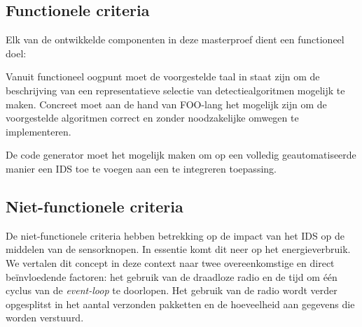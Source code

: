 \vspace{-3mm}

\subsection{Functionele criteria}

Elk van de ontwikkelde componenten in deze masterproef dient een functioneel
doel:

\begin{description}[noitemsep, topsep=0pt, partopsep=1pt]

  \item[Expressiviteit] Vanuit functioneel oogpunt moet de voorgestelde taal in
  staat zijn om de beschrijving van een representatieve selectie van
  detectiealgoritmen mogelijk te maken. Concreet moet aan de hand van FOO-lang
  het mogelijk zijn om de voorgestelde algoritmen correct en zonder
  noodzakelijke omwegen te implementeren.

  \item[Automatiseerbaarheid] De code generator moet het mogelijk maken om op
  een volledig geautomatiseerde manier een IDS toe te voegen aan een te
  integreren toepassing.

\end{description}

\vspace{-3mm}

\subsection{Niet-functionele criteria}

De niet-functionele criteria hebben betrekking op de impact van het IDS op de
middelen van de sensorknopen. In essentie komt dit neer op het energieverbruik.
We vertalen dit concept in deze context naar twee overeenkomstige en direct
be\"invloedende factoren: het gebruik van de draadloze radio en de tijd om
\'e\'en cyclus van de \emph{event-loop} te doorlopen. Het gebruik van de radio
wordt verder opgesplitst in het aantal verzonden pakketten en de hoeveelheid
aan gegevens die worden verstuurd.

